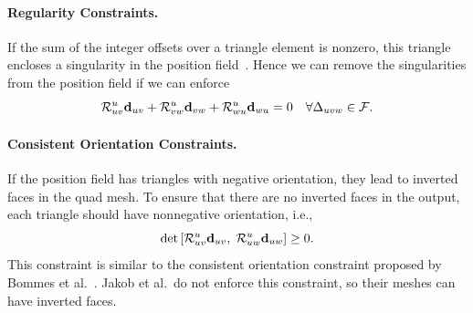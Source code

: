 \label{sec:quad-constraints}
\paragraph*{Regularity Constraints.}
If the sum of the integer offsets over a triangle element is nonzero, this triangle encloses a singularity in the position field~\cite{jakob2015instant}. Hence we can remove the singularities from the position field if we can enforce
\begin{equation}
\mathcal{R}^u_{uv}{\mathbf{d}}_{uv} + \mathcal{R}^u_{vw}{\mathbf{d}}_{vw} + \mathcal{R}^u_{wu}{\mathbf{d}}_{wu} = 0 \quad \forall \Delta_{uvw}\in \mathcal{F}.
\label{eq:quad-consistent}
\end{equation}

\paragraph*{Consistent Orientation Constraints.}
If the position field has triangles with negative orientation, they lead to inverted faces in the quad mesh. To ensure that there are no inverted faces in the output, each triangle should have nonnegative orientation, i.e.,
\begin{equation}
\text{det} \left[\mathcal{R}^u_{uv}{\mathbf{d}}_{uv},\;\mathcal{R}^u_{uw}{\mathbf{d}}_{uw}\right]\geq 0. \label{eq:quad-noflip}
\end{equation}
This constraint is similar to the consistent orientation constraint proposed by Bommes et al.~\cite{bommes2013integer}. Jakob et al.\ do not enforce this constraint, so their meshes can have inverted faces.

